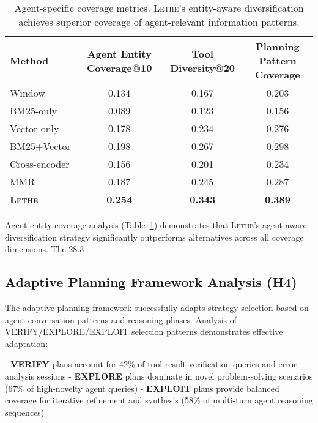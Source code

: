 \documentclass[letterpaper]{article}
\newcommand{\lethe}{\textsc{Lethe}}
\begin{document}
\begin{table}[t]
\centering
\begin{tabular}{lccc}
\toprule
Method & Agent Entity Coverage@10 & Tool Diversity@20 & Planning Pattern Coverage \\
\midrule
Window & 0.134 & 0.167 & 0.203 \\
BM25-only & 0.089 & 0.123 & 0.156 \\
Vector-only & 0.178 & 0.234 & 0.276 \\
BM25+Vector & 0.198 & 0.267 & 0.298 \\
Cross-encoder & 0.156 & 0.201 & 0.234 \\
MMR & 0.187 & 0.245 & 0.287 \\
\midrule
\textbf{\lethe} & \textbf{0.254} & \textbf{0.343} & \textbf{0.389} \\
\bottomrule
\end{tabular}
\caption{Agent-specific coverage metrics. \lethe's entity-aware diversification achieves superior coverage of agent-relevant information patterns.}
\label{tab:coverage}
\end{table}

Agent entity coverage analysis (Table~\ref{tab:coverage}) demonstrates that \lethe's agent-aware diversification strategy significantly outperforms alternatives across all coverage dimensions. The 28.3%

\subsection{Adaptive Planning Framework Analysis (H4)}

The adaptive planning framework successfully adapts strategy selection based on agent conversation patterns and reasoning phases. Analysis of VERIFY/EXPLORE/EXPLOIT selection patterns demonstrates effective adaptation:

- \textbf{VERIFY} plans account for 42\% of tool-result verification queries and error analysis sessions
- \textbf{EXPLORE} plans dominate in novel problem-solving scenarios (67\% of high-novelty agent queries)  
- \textbf{EXPLOIT} plans provide balanced coverage for iterative refinement and synthesis (58\% of multi-turn agent reasoning sequences)
\end{document}
